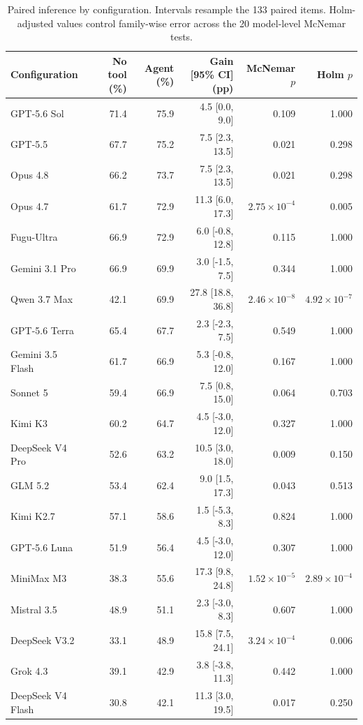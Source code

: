 \begin{table}[t]
\centering
\small
\setlength{\tabcolsep}{4pt}
\caption{Paired inference by configuration. Intervals resample the 133 paired items. Holm-adjusted values control family-wise error across the 20 model-level McNemar tests.}
\label{tab:paired-model-inference}
\begin{tabular}{lrrrrr}
\toprule
Configuration & No tool (\%) & Agent (\%) & Gain [95\% CI] (pp) & McNemar $p$ & Holm $p$ \\
\midrule
GPT-5.6 Sol & 71.4 & 75.9 & 4.5 [0.0, 9.0] & 0.109 & 1.000 \\
GPT-5.5 & 67.7 & 75.2 & 7.5 [2.3, 13.5] & 0.021 & 0.298 \\
Opus 4.8 & 66.2 & 73.7 & 7.5 [2.3, 13.5] & 0.021 & 0.298 \\
Opus 4.7 & 61.7 & 72.9 & 11.3 [6.0, 17.3] & $2.75\mathbin{\times}10^{-4}$ & 0.005 \\
Fugu-Ultra & 66.9 & 72.9 & 6.0 [-0.8, 12.8] & 0.115 & 1.000 \\
Gemini 3.1 Pro & 66.9 & 69.9 & 3.0 [-1.5, 7.5] & 0.344 & 1.000 \\
Qwen 3.7 Max & 42.1 & 69.9 & 27.8 [18.8, 36.8] & $2.46\mathbin{\times}10^{-8}$ & $4.92\mathbin{\times}10^{-7}$ \\
GPT-5.6 Terra & 65.4 & 67.7 & 2.3 [-2.3, 7.5] & 0.549 & 1.000 \\
Gemini 3.5 Flash & 61.7 & 66.9 & 5.3 [-0.8, 12.0] & 0.167 & 1.000 \\
Sonnet 5 & 59.4 & 66.9 & 7.5 [0.8, 15.0] & 0.064 & 0.703 \\
Kimi K3 & 60.2 & 64.7 & 4.5 [-3.0, 12.0] & 0.327 & 1.000 \\
DeepSeek V4 Pro & 52.6 & 63.2 & 10.5 [3.0, 18.0] & 0.009 & 0.150 \\
GLM 5.2 & 53.4 & 62.4 & 9.0 [1.5, 17.3] & 0.043 & 0.513 \\
Kimi K2.7 & 57.1 & 58.6 & 1.5 [-5.3, 8.3] & 0.824 & 1.000 \\
GPT-5.6 Luna & 51.9 & 56.4 & 4.5 [-3.0, 12.0] & 0.307 & 1.000 \\
MiniMax M3 & 38.3 & 55.6 & 17.3 [9.8, 24.8] & $1.52\mathbin{\times}10^{-5}$ & $2.89\mathbin{\times}10^{-4}$ \\
Mistral 3.5 & 48.9 & 51.1 & 2.3 [-3.0, 8.3] & 0.607 & 1.000 \\
DeepSeek V3.2 & 33.1 & 48.9 & 15.8 [7.5, 24.1] & $3.24\mathbin{\times}10^{-4}$ & 0.006 \\
Grok 4.3 & 39.1 & 42.9 & 3.8 [-3.8, 11.3] & 0.442 & 1.000 \\
DeepSeek V4 Flash & 30.8 & 42.1 & 11.3 [3.0, 19.5] & 0.017 & 0.250 \\
\bottomrule
\end{tabular}
\end{table}


